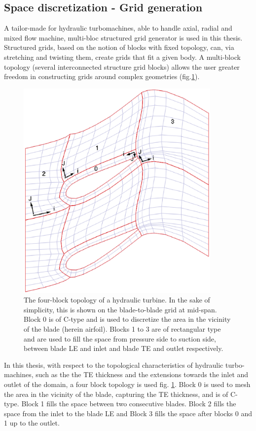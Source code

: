 \subsection{Space discretization - Grid generation}
\label{SpaceDisct}
A tailor-made for hydraulic turbomachines, able to handle axial, radial and mixed flow machine, multi-bloc structured grid generator is used in this thesis. Structured grids, based on the notion of blocks with fixed topology, can, via stretching and twisting them, create grids that fit a given  body. A multi-block topology (several interconnected structure grid blocks) allows the user greater freedom in constructing grids around complex geometries (fig.\ref{grid1}). 


\begin{figure}[h!]
\centering
\includegraphics[width=100mm]{cGridSkBlockIndex.eps} 
\caption{The four-block topology of a hydraulic turbine. In the sake of simplicity, this is shown on the blade-to-blade grid at mid-span. Block 0 is of C-type and is used to discretize the area in the vicinity of the blade (herein airfoil). Blocks 1 to 3 are of rectangular type and are used to fill the space from pressure side to suction side, between blade LE and inlet and  blade TE and outlet respectively. }
\label{grid1}
\end{figure}


In this thesis, with respect to the topological characteristics of hydraulic turbo-machines, such as the the TE thickness and the extensions towards the inlet and outlet of the domain, a four block topology is used  fig. \ref{grid1}. Block 0 is used to mesh the area in the vicinity of the blade, capturing the TE thickness, and is of C-type. Block 1 fills the space between two consecutive blades. Block 2 fills the space from the inlet to the blade LE and Block 3 fills the space after blocks 0 and 1 up to the outlet. 

